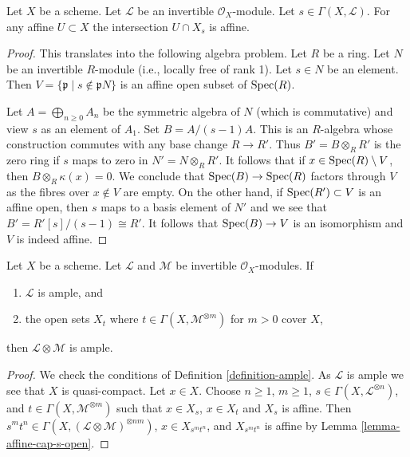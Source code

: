 \begin{lemma}
\label{lemma-affine-cap-s-open}
Let $X$ be a scheme. Let $\mathcal{L}$ be an invertible $\mathcal{O}_X$-module.
Let $s \in \Gamma(X, \mathcal{L})$. For any affine $U \subset X$
the intersection $U \cap X_s$ is affine.
\end{lemma}

\begin{proof}
This translates into the following algebra problem.
Let $R$ be a ring. Let $N$ be an invertible $R$-module
(i.e., locally free of rank 1). Let $s \in N$ be an element.
Then $V = \{\mathfrak p \mid s \not \in \mathfrak p N\}$ is
an affine open subset of $\mathop{\mathrm{Spec}}(R)$.

\medskip\noindent
Let $A = \bigoplus_{n \geq 0} A_n$ be the symmetric algebra of $N$
(which is commutative) and view $s$ as an element of $A_1$.
Set $B = A/(s - 1)A$. This is an $R$-algebra whose construction
commutes with any base change $R \to R'$. Thus $B' = B \otimes_R R'$
is the zero ring if $s$ maps to zero in $N' = N \otimes_R R'$. It
follows that if $x \in \mathop{\mathrm{Spec}}(R) \setminus V$, then $B \otimes_R \kappa(x) = 0$.
We conclude that $\mathop{\mathrm{Spec}}(B) \to \mathop{\mathrm{Spec}}(R)$ factors through $V$ as the
fibres over $x \not \in V$ are empty. On the other hand, if
$\mathop{\mathrm{Spec}}(R') \subset V$ is an affine open, then $s$ maps to a basis
element of $N'$ and we see that $B' = R'[s]/(s - 1) \cong R'$.
It follows that $\mathop{\mathrm{Spec}}(B) \to V$ is an isomorphism and $V$ is
indeed affine.
\end{proof}

\begin{lemma}
\label{lemma-ample-tensor-globally-generated}
\begin{reference}
\cite[II Proposition 4.5.6(ii)]{EGA}
\end{reference}
Let $X$ be a scheme. Let $\mathcal{L}$ and $\mathcal{M}$
be invertible $\mathcal{O}_X$-modules. If
\begin{enumerate}
\item $\mathcal{L}$ is ample, and
\item the open sets $X_t$ where $t \in \Gamma(X, \mathcal{M}^{\otimes m})$
for $m > 0$ cover $X$,
\end{enumerate}
then $\mathcal{L} \otimes \mathcal{M}$ is ample.
\end{lemma}

\begin{proof}
We check the conditions of Definition \ref{definition-ample}.
As $\mathcal{L}$ is ample we see that $X$ is quasi-compact.
Let $x \in X$. Choose $n \geq 1$, $m \geq 1$,
$s \in \Gamma(X, \mathcal{L}^{\otimes n})$, and
$t \in \Gamma(X, \mathcal{M}^{\otimes m})$
such that $x \in X_s$, $x \in X_t$ and $X_s$ is affine.
Then $s^mt^n \in \Gamma(X, (\mathcal{L} \otimes \mathcal{M})^{\otimes nm})$,
$x \in X_{s^mt^n}$, and $X_{s^mt^n}$ is affine by
Lemma \ref{lemma-affine-cap-s-open}.
\end{proof}

